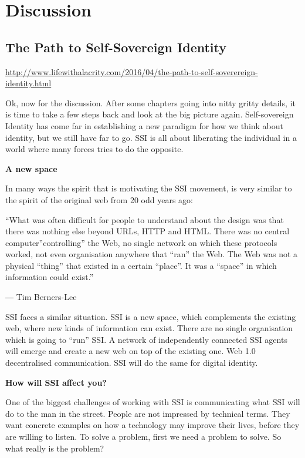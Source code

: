 \hypertarget{discussion}{%
\chapter{Discussion}\label{discussion}}

\hypertarget{the-path-to-self-sovereign-identity}{%
\section{The Path to Self-Sovereign
Identity}\label{the-path-to-self-sovereign-identity}}

\url{http://www.lifewithalacrity.com/2016/04/the-path-to-self-soverereign-identity.html}

Ok, now for the discussion. After some chapters going into nitty gritty
details, it is time to take a few steps back and look at the big picture
again. Self-sovereign Identity has come far in establishing a new
paradigm for how we think about identity, but we still have far to go.
SSI is all about liberating the individual in a world where many forces
tries to do the opposite.

\textbf{A new space}

In many ways the spirit that is motivating the SSI movement, is very
similar to the spirit of the original web from 20 odd years ago:

``What was often difficult for people to understand about the design was
that there was nothing else beyond URLs, HTTP and HTML. There was no
central computer''controlling'' the Web, no single network on which
these protocols worked, not even organisation anywhere that ``ran'' the
Web. The Web was not a physical ``thing'' that existed in a certain
``place''. It was a ``space'' in which information could exist.''

― Tim Berners-Lee

SSI faces a similar situation. SSI is a new space, which complements the
existing web, where new kinds of information can exist. There are no
single organisation which is going to ``run'' SSI. A network of
independently connected SSI agents will emerge and create a new web on
top of the existing one. Web 1.0 decentralised communication. SSI will
do the same for digital identity.

\textbf{How will SSI affect you?}

One of the biggest challenges of working with SSI is communicating what
SSI will do to the man in the street. People are not impressed by
technical terms. They want concrete examples on how a technology may
improve their lives, before they are willing to listen. To solve a
problem, first we need a problem to solve. So what really is the
problem?

